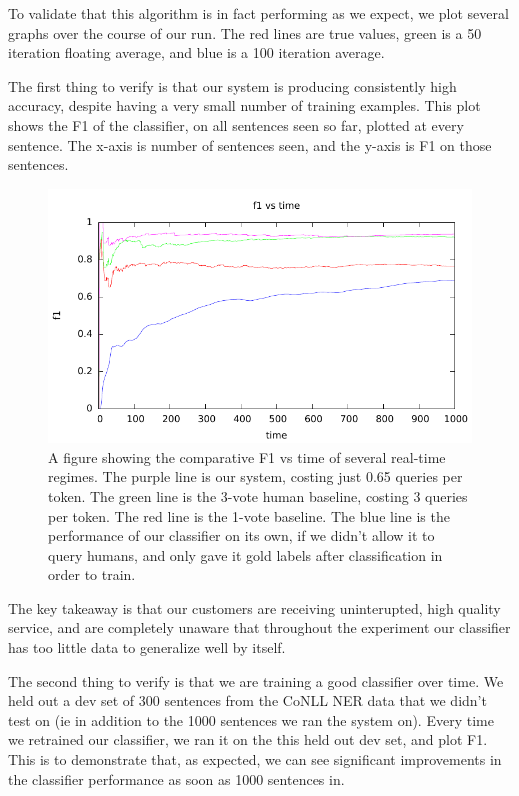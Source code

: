 To validate that this algorithm is in fact performing as we expect, we plot several graphs over the course of our run.
The red lines are true values, green is a 50 iteration floating average, and blue is a 100 iteration average.

The first thing to verify is that our system is producing consistently high accuracy, despite having a very small number of
training examples. This plot shows the F1 of the classifier, on all sentences seen so far, plotted at every sentence.
The x-axis is number of sentences seen, and the y-axis is F1 on those sentences.

\begin{figure}[t]
  \begin{centering}
  \includegraphics[width=1.0\textwidth]{figures/ner_2_class/f1_plot/f1_vs_time.pdf}
  \end{centering}
  \caption{A figure showing the comparative F1 vs time of several real-time regimes. The purple line is our system, costing just 0.65 queries per token. The green line is the 3-vote human baseline, costing 3 queries per token. The red line is the 1-vote baseline. The blue line is the performance of our classifier on its own, if we didn't allow it to query humans, and only gave it gold labels after classification in order to train.}
\label{fig:crf}
\end{figure}

The key takeaway is that our customers are receiving uninterupted, high quality service, and are completely unaware that throughout the experiment our classifier has too little data to generalize well by itself.

The second thing to verify is that we are training a good classifier over time. We held out a dev set of 300 sentences from
the CoNLL NER data that we didn't test on (ie in addition to the 1000 sentences we ran the system on). Every time we retrained
our classifier, we ran it on the this held out dev set, and plot F1. This is to demonstrate that, as expected, we can see
significant improvements in the classifier performance as soon as 1000 sentences in.

